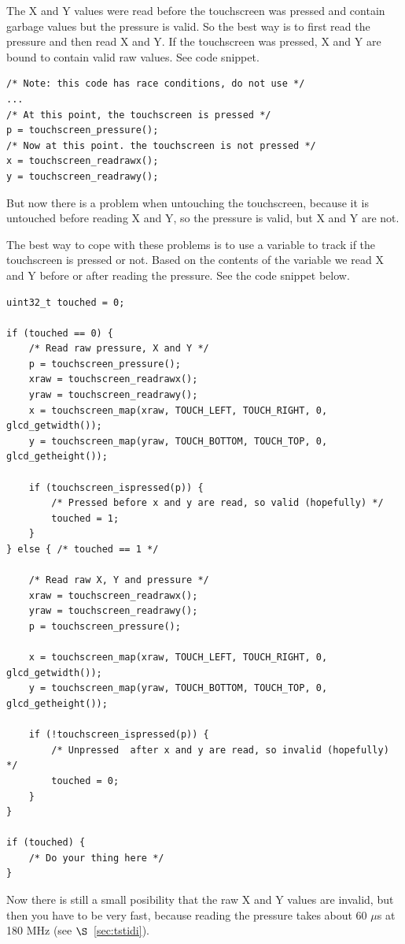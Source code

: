 \documentclass[12pt]{article}
\begin{document}
The X and Y values were read before the touchscreen was pressed and contain garbage values but the pressure is valid. So the best way is to first read the pressure and then read X and Y. If the touchscreen was pressed, X and Y are bound to contain valid raw values. See code snippet.

\begin{lstlisting}
/* Note: this code has race conditions, do not use */
...
/* At this point, the touchscreen is pressed */
p = touchscreen_pressure();
/* Now at this point. the touchscreen is not pressed */
x = touchscreen_readrawx();
y = touchscreen_readrawy();
\end{lstlisting}

But now there is a problem when untouching the touchscreen, because it is untouched before reading X and Y, so the pressure is valid, but X and Y are not.

The best way to cope with these problems is to use a variable to track if the touchscreen is pressed or not. Based on the contents of the variable we read X and Y before or after reading the pressure. See the code snippet below.

\begin{lstlisting}
uint32_t touched = 0;

if (touched == 0) {
    /* Read raw pressure, X and Y */
    p = touchscreen_pressure();
    xraw = touchscreen_readrawx();
    yraw = touchscreen_readrawy();
    x = touchscreen_map(xraw, TOUCH_LEFT, TOUCH_RIGHT, 0, glcd_getwidth());
    y = touchscreen_map(yraw, TOUCH_BOTTOM, TOUCH_TOP, 0, glcd_getheight());

    if (touchscreen_ispressed(p)) {
        /* Pressed before x and y are read, so valid (hopefully) */
        touched = 1;
    }
} else { /* touched == 1 */

    /* Read raw X, Y and pressure */
    xraw = touchscreen_readrawx();
    yraw = touchscreen_readrawy();
    p = touchscreen_pressure();

    x = touchscreen_map(xraw, TOUCH_LEFT, TOUCH_RIGHT, 0, glcd_getwidth());
    y = touchscreen_map(yraw, TOUCH_BOTTOM, TOUCH_TOP, 0, glcd_getheight());

    if (!touchscreen_ispressed(p)) {
        /* Unpressed  after x and y are read, so invalid (hopefully) */
        touched = 0;
    }
}

if (touched) {
    /* Do your thing here */
}
\end{lstlisting}

Now there is still a small posibility that the raw X and Y values are invalid, but then you have to be very fast, because reading the pressure takes about 60 $\mu$s at 180 MHz (see $\S$~\ref{sec:tstidi}).
\end{document}
